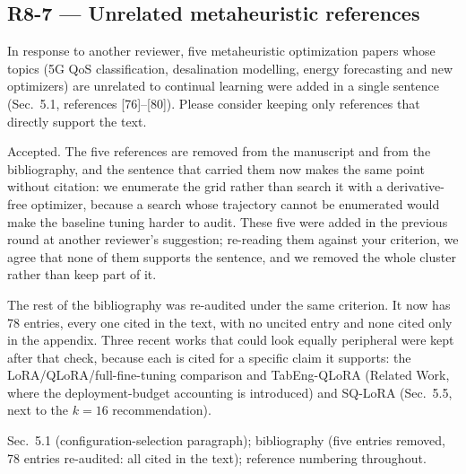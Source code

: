 \subsection*{R8-7 --- Unrelated metaheuristic references}

\begin{rquote}
In response to another reviewer, five metaheuristic optimization papers whose topics (5G QoS
classification, desalination modelling, energy forecasting and new optimizers) are unrelated to
continual learning were added in a single sentence (Sec.~5.1, references [76]--[80]). Please
consider keeping only references that directly support the text.
\end{rquote}

\resp Accepted. The five references are removed from the manuscript and from the bibliography,
and the sentence that carried them now makes the same point without citation: we enumerate the
grid rather than search it with a derivative-free optimizer, because a search whose trajectory
cannot be enumerated would make the baseline tuning harder to audit. These five were added in
the previous round at another reviewer's suggestion; re-reading them against your criterion, we
agree that none of them supports the sentence, and we removed the whole cluster rather than keep
part of it.

The rest of the bibliography was re-audited under the same criterion. It now has 78 entries,
every one cited in the text, with no uncited entry and none cited only in the appendix. Three
recent works that could look equally peripheral were kept after that check, because each is
cited for a specific claim it supports: the LoRA/QLoRA/full-fine-tuning comparison and
TabEng-QLoRA (Related Work, where the deployment-budget accounting is introduced) and SQ-LoRA
(Sec.~5.5, next to the $k{=}16$ recommendation).

\change Sec.~5.1 (configuration-selection paragraph); bibliography (five entries
removed, 78 entries re-audited: all cited in the text); reference numbering throughout.

